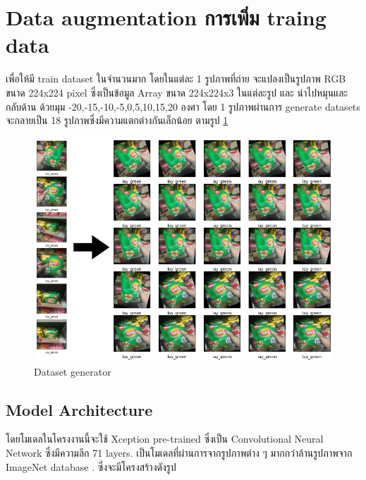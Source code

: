 
\section{Data augmentation การเพิ่ม traing data}
เพื่อให้มี train dataset ในจำนวนมาก  
โดยในแต่ละ 1 รูปภาพที่ถ่าย จะแปลงเป็นรูปภาพ RGB ขนาด 224x224 pixel ซึ่งเป็นข้อมูล Array ขนาด 224x224x3 ในแต่ละรูป
และ   นำไปหมุนและกลับด้าน ด้วยมุม -20,-15,-10,-5,0,5,10,15,20 องศา
โดย 1 รูปภาพผ่านการ generate datasets จะกลายเป็น 18 รูปภาพซึ่งมีความแตกต่างกันเล็กน้อย ตามรูป \ref{fig:Dataset generator}

\begin{figure}[h]
  \begin{center}
   
  \includegraphics[scale=0.4]{pic/lay_genmore.png}
  \end{center}
  
  \caption[Dataset generator]{Dataset generator}
  \label{fig:Dataset generator}
  \end{figure}

  \newpage
\subsection{Model Architecture}
โดยโมเดลในโครงงานนี้จะใช้ Xception pre-trained ซึ่งเป็น Convolutional Neural Network ซึ่งมีความลึก 71 layers.
เป็นโมเดลที่ผ่านการจากรูปภาพต่าง ๆ มากกว่าล้านรูปภาพจาก ImageNet database .
ซึ่งจะมีโครงสร้างดังรูป


